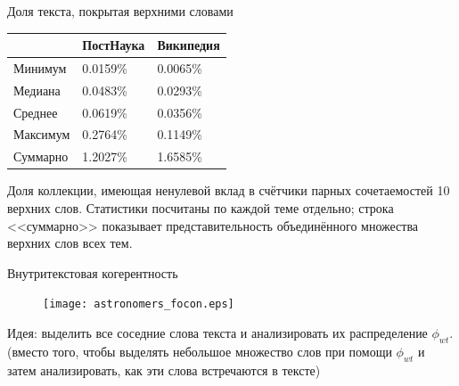 \begin{frame}{Доля текста, покрытая верхними словами}

\begin{table}[ht]
\begin{tabular}{|l|l|l|} \hline
         & ПостНаука & Википедия \\ \hline
Минимум  & 0.0159\%  & 0.0065\%  \\ \hline
Медиана  & 0.0483\%  & 0.0293\%  \\ \hline
Среднее  & 0.0619\%  & 0.0356\%  \\ \hline
Максимум & 0.2764\%  & 0.1149\%  \\ \hline
Суммарно & 1.2027\%  & 1.6585\%  \\ \hline
\end{tabular}
\end{table}
      Доля коллекции, имеющая ненулевой вклад в счётчики парных сочетаемостей 10 верхних слов. Статистики посчитаны по каждой теме отдельно; строка <<суммарно>> показывает представительность объединённого множества верхних слов всех тем.
\end{frame}


\begin{frame}{Внутритекстовая когерентность}

\begin{figure}
    \centering
    \texttt{[image: astronomers\_focon.eps]} %
\end{figure}

Идея: выделить все соседние слова текста и анализировать их распределение $\phi_{wt}$.
\medskip
(вместо того, чтобы выделять небольшое множество слов при помощи $\phi_{wt}$ и затем анализировать, как эти слова встречаются в тексте)

\end{frame}

